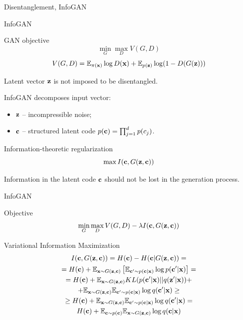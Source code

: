 \begin{frame}{Disentanglement, InfoGAN}
\end{frame}
\begin{frame}{InfoGAN}
	\begin{block}{GAN objective}
		\vspace{-0.6cm}
		\[
		\min_{G} \max_D V(G, D)
		\]
		\[
		V(G, D)  =  \mathbb{E}_{\pi(\mathbf{x})} \log D(\mathbf{x}) + \mathbb{E}_{p(\mathbf{z})} \log (1 - D(G(\mathbf{z})))
		\]
	\end{block}
	Latent vector $\mathbf{z}$ is not imposed to be disentangled.
	
	InfoGAN decomposes input vector:
	\begin{itemize}
		\item $\mathbf{z}$ -- incompressible noise;
		\item $\mathbf{c}$ -- structured latent code $p(\mathbf{c}) = \prod_{j=1}^d p(c_j)$.
	\end{itemize}
	\begin{block}{Information-theoretic regularization}
		\vspace{-0.3cm}
		\[
		\max I (\mathbf{c}, G(\mathbf{z}, \mathbf{c}))
		\]
	\end{block}
	Information in the latent code $\mathbf{c}$ should not be lost in the generation process.
\end{frame}
\begin{frame}{InfoGAN}
	\begin{block}{Objective}
		\vspace{-0.3cm}
		\[
		\min_{G} \max_D V(G, D) - \lambda I (\mathbf{c}, G(\mathbf{z}, \mathbf{c}))
		\]
	\end{block}
	\begin{block}{Variational Information Maximization}
		\vspace{-0.3cm}
		\begin{multline*}
			I (\mathbf{c}, G(\mathbf{z}, \mathbf{c})) = H(\mathbf{c}) - H(\mathbf{c} | G(\mathbf{z}, \mathbf{c})) = \\
			= H(\mathbf{c}) + \mathbb{E}_{\mathbf{x} \sim G(\mathbf{z}, \mathbf{c})} \left[ \mathbb{E}_{\mathbf{c}' \sim p(\mathbf{c} | \mathbf{x})} \log p(\mathbf{c}' | \mathbf{x}) \right] = \\ 
			= H(\mathbf{c}) + \mathbb{E}_{\mathbf{x} \sim G(\mathbf{z}, \mathbf{c})} KL(p(\mathbf{c}'| \mathbf{x}) || q(\mathbf{z}' | \mathbf{x})) + 
			\\ + \mathbb{E}_{\mathbf{x} \sim G(\mathbf{z}, \mathbf{c})}  \mathbb{E}_{\mathbf{c}' \sim p(\mathbf{c} | \mathbf{x})} \log q(\mathbf{c}' | \mathbf{x})  \geq\\
			\geq H(\mathbf{c}) + \mathbb{E}_{\mathbf{x} \sim G(\mathbf{z}, \mathbf{c})} \mathbb{E}_{\mathbf{c}' \sim p(\mathbf{c} | \mathbf{x})} \log q(\mathbf{c}' | \mathbf{x}) = \\
			H(\mathbf{c}) + \mathbb{E}_{\mathbf{c} \sim p(\mathbf{c})} \mathbb{E}_{\mathbf{x} \sim G(\mathbf{z}, \mathbf{c})} \log q(\mathbf{c} | \mathbf{x})
		\end{multline*}
	\end{block}
\end{frame}
